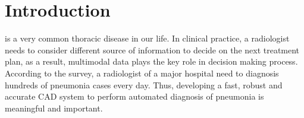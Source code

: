 \documentclass[journal]{IEEEtran}
\begin{document}
%
\IEEEpeerreviewmaketitle



\section{Introduction}
\label{intro}
% 
% 
% 
% 
 is a very common thoracic disease in our life. In clinical practice, a radiologist needs to consider different source of information to decide on the next treatment plan, as a result, multimodal data plays the key role in decision making process. According to the survey, a radiologist of a major hospital need to diagnosis hundreds of pneumonia cases every day. Thus, developing a fast, robust and accurate CAD system to perform automated diagnosis of pneumonia is meaningful and important. 
\end{document}
